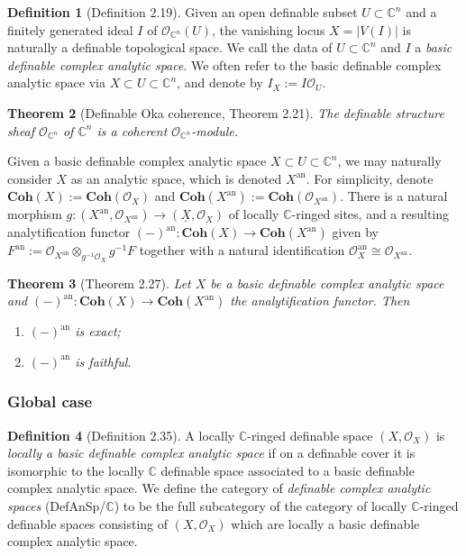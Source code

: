 \documentclass{amsart}
\newtheorem{theorem}{Theorem}[subsection]
\theoremstyle{definition}
\newtheorem{definition}[theorem]{Definition}
\numberwithin{equation}{section}
\newcommand{\analytic}{\mathrm{an}}
\begin{document}
\begin{definition}[Definition 2.19]
  Given an open definable subset $U \subset \mathbb{C}^n$ and
  a finitely generated ideal $I$ of $\mathcal{O}_{\mathbb{C}^n}(U)$,
  the vanishing locus $X = |V(I)|$ is naturally a definable topological space.
  We call the data of $U \subset \mathbb{C}^n$ and $I$ a \emph{basic definable complex analytic space}.
  We often refer to the basic definable complex analytic space via $X \subset U \subset \mathbb{C}^n$,
  and denote by $I_X := I\mathcal{O}_U$.
\end{definition}

\begin{theorem}[Definable Oka coherence, Theorem 2.21]
  The definable structure sheaf $\mathcal{O}_{\mathbb{C}^n}$ of $\mathbb{C}^n$ is a coherent $\mathcal{O}_{\mathbb{C}^n}$-module.
\end{theorem}

Given a basic definable complex analytic space $X \subset U \subset \mathbb{C}^n$,
we may naturally consider $X$ as an analytic space,
which is denoted $X^{\analytic}$.
For simplicity, denote $\mathbf{Coh}(X) := \mathbf{Coh}(\mathcal{O}_X)$ and
$\mathbf{Coh}(X^{\analytic}) := \mathbf{Coh}(\mathcal{O}_{X^{\analytic}})$.
There is a natural morphism $g: (X^{\analytic},\mathcal{O}_{X^{\analytic}}) \to (\underline{X},\mathcal{O}_X)$
of locally $\mathbb{C}$-ringed sites,
and a resulting analytification functor $(-)^{\analytic}: \mathbf{Coh}(X) \to \mathbf{Coh}(X^{\analytic})$
given by $F^{\analytic} := \mathcal{O}_{X^{\analytic}} \otimes_{g^{-1}\mathcal{O}_X} g^{-1}F$ together with
a natural identification $\mathcal{O}_X^{\analytic} \cong \mathcal{O}_{X^{\analytic}}$.

\begin{theorem}[Theorem 2.27]
  Let $X$ be a basic definable complex analytic space and
  $(-)^{\analytic} : \mathbf{Coh}(X) \to \mathbf{Coh}(X^{\analytic})$ the analytification functor.
  Then
  \begin{enumerate}[label = {(\arabic*)}]
    \item $(-)^{\analytic}$ is exact;
    \item $(-)^{\analytic}$ is faithful.
  \end{enumerate}
\end{theorem}

\subsubsection{Global case}
\begin{definition}[Definition 2.35]
  A locally $\mathbb{C}$-ringed definable space $(X,\mathcal{O}_X)$ is \emph{locally a basic definable complex analytic space}
  if on a definable cover it is isomorphic to the locally $\mathbb{C}$ definable space
  associated to a basic definable complex analytic space.
  We define the category of \emph{definable complex analytic spaces} (DefAnSp/$\mathbb{C}$) to be
  the full subcategory of the category of locally $\mathbb{C}$-ringed definable spaces consisting of $(X,\mathcal{O}_X)$
  which are locally a basic definable complex analytic space.
\end{definition}
\end{document}
